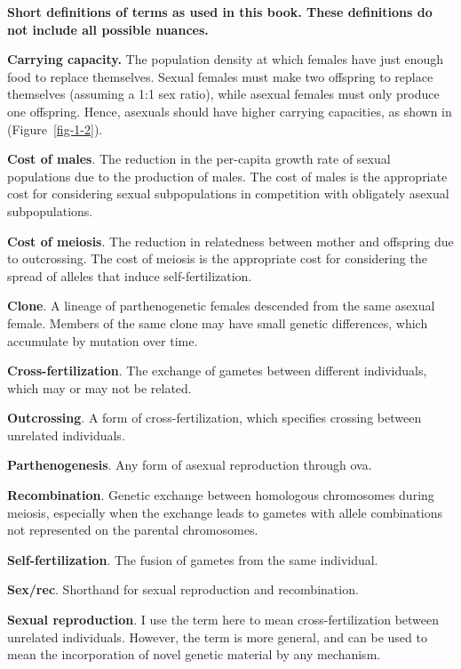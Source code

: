 \documentclass[
  letterpaper,
]{book}
\begin{document}
\begin{tcolorbox}[enhanced jigsaw, bottomrule=.15mm, colframe=quarto-callout-tip-color-frame, arc=.35mm, rightrule=.15mm, title=\textcolor{quarto-callout-tip-color}{\faLightbulb}\hspace{0.5em}{Box 1.1}, breakable, opacityback=0, colbacktitle=quarto-callout-tip-color!10!white, leftrule=.75mm, bottomtitle=1mm, coltitle=black, toprule=.15mm, toptitle=1mm, titlerule=0mm, left=2mm, opacitybacktitle=0.6, colback=white]

\textbf{Short definitions of terms as used in this book. These
definitions do not include all possible nuances.}

\textbf{Carrying capacity.} The population density at which females have
just enough food to replace themselves. Sexual females must make two
offspring to replace themselves (assuming a 1:1 sex ratio), while
asexual females must only produce one offspring. Hence, asexuals should
have higher carrying capacities, as shown in (Figure~\ref{fig-1-2}).

\textbf{Cost of males}. The reduction in the per-capita growth rate of
sexual populations due to the production of males. The cost of males is
the appropriate cost for considering sexual subpopulations in
competition with obligately asexual subpopulations.

\textbf{Cost of meiosis}. The reduction in relatedness between mother
and offspring due to outcrossing. The cost of meiosis is the appropriate
cost for considering the spread of alleles that induce
self-fertilization.

\textbf{Clone}. A lineage of parthenogenetic females descended from the
same asexual female. Members of the same clone may have small genetic
differences, which accumulate by mutation over time.

\textbf{Cross-fertilization}. The exchange of gametes between different
individuals, which may or may not be related.

\textbf{Outcrossing}. A form of cross-fertilization, which specifies
crossing between unrelated individuals.

\textbf{Parthenogenesis}. Any form of asexual reproduction through ova.

\textbf{Recombination}. Genetic exchange between homologous chromosomes
during meiosis, especially when the exchange leads to gametes with
allele combinations not represented on the parental chromosomes.

\textbf{Self-fertilization}. The fusion of gametes from the same
individual.

\textbf{Sex/rec}. Shorthand for sexual reproduction and recombination.

\textbf{Sexual reproduction}. I use the term here to mean
cross-fertilization between unrelated individuals. However, the term is
more general, and can be used to mean the incorporation of novel genetic
material by any mechanism.

\end{tcolorbox}
\end{document}
